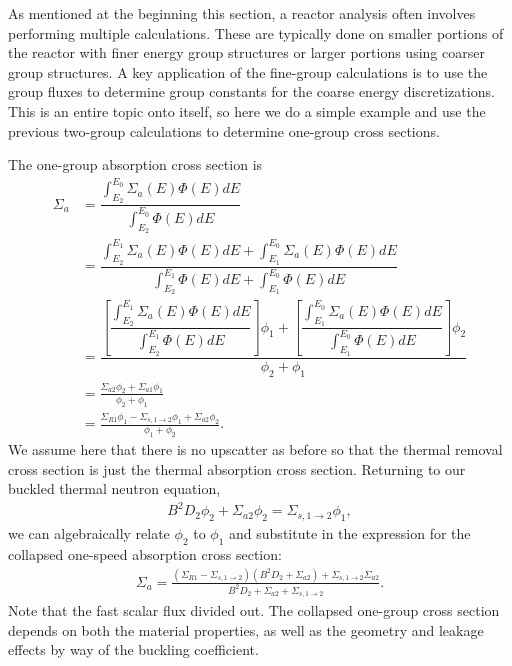 As mentioned at the beginning this section, a reactor analysis often involves performing multiple calculations. These are typically done on smaller portions of the reactor with finer energy group structures or larger portions using coarser group structures. A key application of the fine-group calculations is to use the group fluxes to determine group constants for the coarse energy discretizations. This is an entire topic onto itself, so here we do a simple example and use the previous two-group calculations to determine one-group cross sections. 

The one-group absorption cross section is
\begin{align}
  \Sigma_a 
  &= \dfrac{ \displaystyle\int_{E_2}^{E_0} \Sigma_a(E) \Phi(E) dE }{ \displaystyle\int_{E_2}^{E_0} \Phi(E) dE } \nonumber \\
  &= \dfrac{ \displaystyle\int_{E_2}^{E_1} \Sigma_a(E) \Phi(E) dE + \int_{E_1}^{E_0} \Sigma_a(E) \Phi(E) dE }{ \displaystyle\int_{E_2}^{E_1} \Phi(E) dE + \int_{E_1}^{E_0} \Phi(E) dE } \nonumber \\
  &= \dfrac{ \left[ \dfrac{ \displaystyle\int_{E_2}^{E_1} \Sigma_a(E) \Phi(E) dE }{ \displaystyle\int_{E_2}^{E_1} \Phi(E) dE } \right] \phi_1 
  			+ \left[ \dfrac{ \displaystyle\int_{E_1}^{E_0} \Sigma_a(E) \Phi(E) dE  }{ \displaystyle\int_{E_1}^{E_0} \Phi(E) dE } \right] \phi_2  }{ \phi_2 + \phi_1 } \nonumber \\
  &= \frac{ \Sigma_{a2} \phi_2 + \Sigma_{a1} \phi_1 }{ \phi_2 + \phi_1 } \nonumber \\
  &= \frac{ \Sigma_{R1} \phi_1 - \Sigma_{s,1\rightarrow 2} \phi_1 + \Sigma_{a2} \phi_2 }{ \phi_1 + \phi_2 } .
\end{align}
We assume here that there is no upscatter as before so that the thermal removal cross section is just the thermal absorption cross section. Returning to our buckled thermal neutron equation,
\begin{align}
  B^2 D_2 \phi_2 + \Sigma_{a2} \phi_2 = \Sigma_{s,1\rightarrow 2} \phi_1 , \nonumber
\end{align}
we can algebraically relate $\phi_2$ to $\phi_1$ and substitute in the expression for the collapsed one-speed absorption cross section:
\begin{align}
  \Sigma_a = \frac{ ( \Sigma_{R1} - \Sigma_{s,1\rightarrow 2} ) ( B^2 D_2 + \Sigma_{a2} ) + \Sigma_{s,1\rightarrow 2} \Sigma_{a2} }{ B^2 D_2 + \Sigma_{a2} + \Sigma_{s,1\rightarrow 2} } .
\end{align}
Note that the fast scalar flux divided out. The collapsed one-group cross section depends on both the material properties, as well as the geometry and leakage effects by way of the buckling coefficient. 

